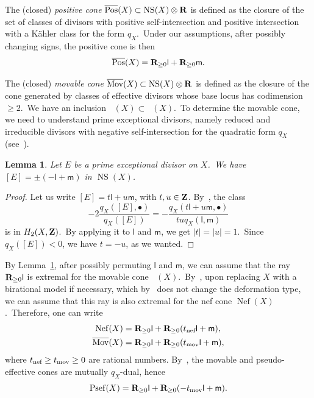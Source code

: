 \documentclass[12pt]{amsart}
\def\Z{{\bf Z}}
\def\R{{\bf R}}
\DeclareMathOperator{\Mov}{\overline{Mov}}
\DeclareMathOperator{\Nef}{Nef}
\DeclareMathOperator{\NS}{NS}
\DeclareMathOperator{\Pos}{\overline{Pos}}
\DeclareMathOperator{\Psef}{Psef}
\newtheorem{lemm}{Lemma}[section]
\theoremstyle{remark}
\def\lll{\ensuremath{\mathsf l}}
\def\mm{\ensuremath{\mathsf m}}
\begin{document}
The (closed) \emph{positive cone} $\Pos(X)\subset\NS(X)\otimes\R$ is defined as the closure of the set of   classes of divisors with positive self-intersection and   positive intersection with a K\"ahler class for the form  $q_X$.\
Under our assumptions, after possibly changing signs, the positive cone is then
\[
\Pos(X) =\R_{\ge 0}\lll + \R_{\ge 0} \mm.
\]

The (closed) \emph{movable cone} $\Mov(X)\subset\NS(X)\otimes\R$ is defined as the closure of the cone generated by classes of effective divisors whose  base locus has codimension $\geq2$.\
We have an inclusion $\Mov(X)\subset\Pos(X)$.\
To determine the movable cone, we need to understand prime exceptional divisors, namely reduced and irreducible divisors with negative self-intersection for the quadratic form $q_X$ (see~\cite[Lemma~6.22]{mar:survey}).

\begin{lemm}\label{lem:PrimeExceptional}
Let $E$ be a prime exceptional divisor on $X$.\
We have $[E]=\pm(-\lll+\mm)$ in $\NS(X)$.
\end{lemm}

\begin{proof}
Let us write $[E]=t\lll+u\mm$, with $t,u\in\Z$.
By~\cite[Corollary~3.6]{mar}, the class
\[
-2\frac{q_X([E],\bullet)}{q_X([E])} = -\frac{q_X(t\lll+u\mm,\bullet)}{tuq_X(\lll,\mm)}
\]
is 
in $H_2(X,\Z)$.\
By applying it to $\lll$ and $\mm$, we get $|t|=|u|=1$.\ Since $q_X([E])<0$, we have $t=-u$, as we wanted.
\end{proof}

By Lemma~\ref{lem:PrimeExceptional}, after possibly permuting $\lll$ and $\mm$, we can assume that the ray $\R_{\ge0}\lll$ is extremal for the movable cone $\Mov(X)$.\
By~\cite[Theorem~7]{hats}, upon replacing $X$ with a birational model if necessary, which by~\cite[Theorem 4.6]{HuyHK} does not change the deformation type, we can assume that this ray is also extremal for the nef cone $\Nef(X)$.\
Therefore, one can write
\begin{align*}
\Nef(X)&=\R_{\ge 0}\lll + \R_{\ge 0} (t_{\textnormal{nef}}\lll+\mm),\\
\Mov(X)&=\R_{\ge 0}\lll + \R_{\ge 0} (t_{\textnormal{mov}}\lll+\mm),
\end{align*}
where $t_{\textnormal{nef}}\ge t_{\textnormal{mov}}\ge 0$ are rational numbers.
By~\cite[prop.~4.4]{bou}, the movable and pseudo-effective cones are mutually $q_X$-dual, hence
\[
\Psef(X)=\R_{\ge 0}\lll + \R_{\ge 0} (-t_{\textnormal{mov}}\lll+\mm).
\]
\end{document}

